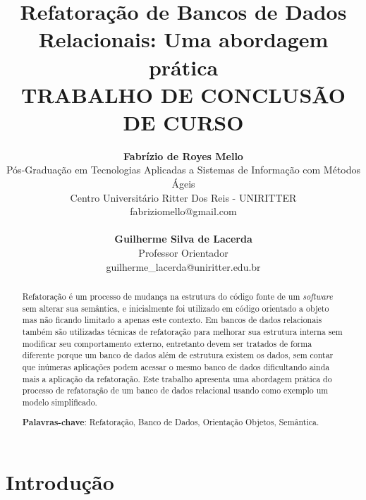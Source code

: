 \documentclass[10pt]{article}
\begin{document}
\title{Refatoração de Bancos de Dados Relacionais: Uma abordagem prática\\ \smallskip
\small{TRABALHO DE CONCLUSÃO DE CURSO}}

\author{
	{\bf Fabrízio de Royes Mello }\\ 
	{\normalsize Pós-Graduação em Tecnologias Aplicadas a Sistemas de Informação com Métodos Ágeis} \\
	{\normalsize Centro Universitário Ritter Dos Reis - UNIRITTER} \\
	{\normalsize fabriziomello@gmail.com}  \\ \\
	{\bf Guilherme Silva de Lacerda } \\
	{\normalsize Professor Orientador}\\
	{\normalsize guilherme\_lacerda@uniritter.edu.br} \\
}
\maketitle


\begin{abstract}
\maketitle
\noindent
\small
Refatoração é um processo de mudança na estrutura do código fonte de um \textit{software} sem alterar sua semântica, e inicialmente foi utilizado em código orientado a objeto mas não ficando limitado a apenas este contexto. Em bancos de dados relacionais também são utilizadas técnicas de refatoração para melhorar sua estrutura interna sem modificar seu comportamento externo, entretanto devem ser tratados de forma diferente porque um banco de dados além de estrutura existem os dados, sem contar que inúmeras aplicações podem acessar o mesmo banco de dados dificultando ainda mais a aplicação da refatoração. Este trabalho apresenta uma abordagem prática do processo de refatoração de um banco de dados relacional usando como exemplo um modelo simplificado.

\noindent
\textbf{Palavras-chave}: Refatoração, Banco de Dados, Orientação Objetos, Semântica.
\end{abstract}

\maketitle
\section{Introdução}\label{sec:intro}
\end{document}
